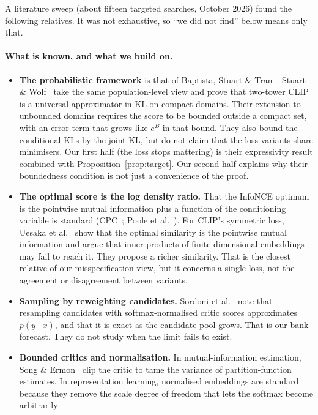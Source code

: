 \documentclass[11pt]{article}
\theoremstyle{plain}
\theoremstyle{definition}
\theoremstyle{remark}
\begin{document}
A literature sweep (about fifteen targeted searches, October 2026) found the following
relatives. It was not exhaustive, so ``we did not find'' below means only that.

\paragraph{What is known, and what we build on.}
\begin{itemize}
\item \textbf{The probabilistic framework} is that of Baptista, Stuart \& Tran~\cite{bst}.
  Stuart \& Wolf~\cite{stuartwolf} take the same population-level view and prove that
  two-tower CLIP is a universal approximator in KL on compact domains. Their extension to
  unbounded domains requires the score to be bounded outside a compact set, with an error
  term that grows like $e^{B}$ in that bound. They also bound the conditional KLs by the joint
  KL, but do not claim that the loss variants share minimisers. Our first half (the loss stops
  mattering) is their expressivity result combined with Proposition~\ref{prop:target}. Our
  second half explains why their boundedness condition is not just a convenience of the
  proof.
\item \textbf{The optimal score is the log density ratio.} That the InfoNCE optimum is the
  pointwise mutual information plus a function of the conditioning variable is standard
  (CPC~\cite{cpc}; Poole et al.~\cite{poole}). For CLIP's symmetric loss, Uesaka et
  al.~\cite{uesaka} show that the optimal similarity is the pointwise mutual information and
  argue that inner products of finite-dimensional embeddings may fail to reach it. They
  propose a richer similarity. That is the closest relative of our misspecification view, but
  it concerns a single loss, not the agreement or disagreement between variants.
\item \textbf{Sampling by reweighting candidates.} Sordoni et al.~\cite{sordoni} note that
  resampling candidates with softmax-normalised critic scores approximates $p(y\mid x)$, and
  that it is exact as the candidate pool grows. That is our bank forecast. They do not study
  when the limit fails to exist.
\item \textbf{Bounded critics and normalisation.} In mutual-information estimation, Song \&
  Ermon~\cite{songermon} clip the critic to tame the variance of partition-function
  estimates. In representation learning, normalised embeddings are standard because they
  remove the scale degree of freedom that lets the softmax become arbitrarily

\end{itemize}
\end{document}
